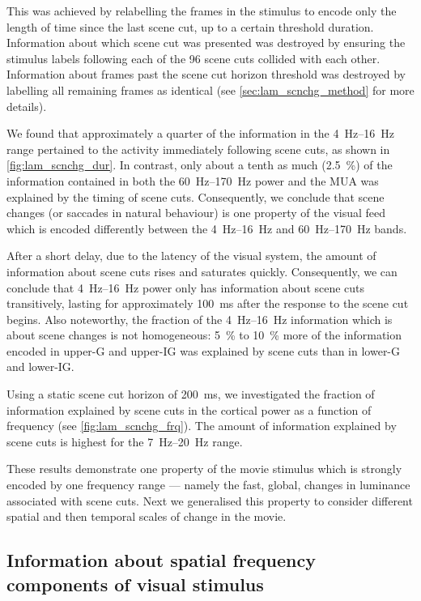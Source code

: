 This was achieved by relabelling the frames in the stimulus to encode only the length of time since the last scene cut, up to a certain threshold duration.
Information about which scene cut was presented was destroyed by ensuring the stimulus labels following each of the \num{96} scene cuts collided with each other.
Information about frames past the scene cut horizon threshold was destroyed by labelling all remaining frames as identical (see \autoref{sec:lam_scnchg_method} for more details).

We found that approximately a quarter of the information in the \SIrange{4}{16}{Hz} range pertained to the activity immediately following scene cuts, as shown in \autoref{fig:lam_scnchg_dur}.
In contrast, only about a tenth as much (\SI{2.5}{\percent}) of the information contained in both the \SIrange{60}{170}{Hz} power and the \ac{MUA} was explained by the timing of scene cuts.
Consequently, we conclude that scene changes (or saccades in natural behaviour) is one property of the visual feed which is encoded differently between the \SIrange{4}{16}{Hz} and \SIrange{60}{170}{Hz} bands.

After a short delay, due to the latency of the visual system, the amount of information about scene cuts rises and saturates quickly.
Consequently, we can conclude that \SIrange{4}{16}{Hz} power only has information about scene cuts transitively, lasting for approximately \SI{100}{\milli\second} after the response to the scene cut begins.
Also noteworthy, the fraction of the \SIrange{4}{16}{Hz} information which is about scene changes is not homogeneous: \SI{5}{\percent} to \SI{10}{\percent} more of the information encoded in upper-\ac{G} and upper-\ac{IG} was explained by scene cuts than in lower-\ac{G} and lower-\ac{IG}.

Using a static scene cut horizon of \SI{200}{\milli\second}, we investigated the fraction of information explained by scene cuts in the cortical power as a function of frequency (see \autoref{fig:lam_scnchg_frq}).
The amount of information explained by scene cuts is highest for the \SIrange{7}{20}{Hz} range.

These results demonstrate one property of the movie stimulus which is strongly encoded by one frequency range --- namely the fast, global, changes in luminance associated with scene cuts.
Next we generalised this property to consider different spatial and then temporal scales of change in the movie.


\subsection{Information about spatial frequency components of visual stimulus}

